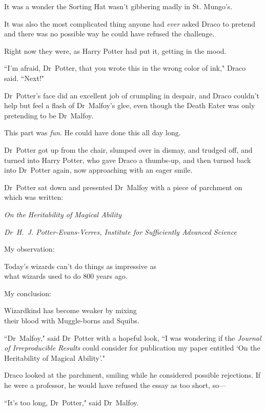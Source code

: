 It was a wonder the Sorting Hat wasn't gibbering madly in St. Mungo's.

It was also the most complicated thing anyone had \emph{ever} asked Draco to pretend and there was no possible way he could have refused the challenge.

Right now they were, as Harry Potter had put it, getting in the mood.

``I'm afraid, Dr~Potter, that you wrote this in the wrong color of ink," Draco said. ``Next!"

Dr~Potter's face did an excellent job of crumpling in despair, and Draco couldn't help but feel a flash of Dr~Malfoy's glee, even though the Death Eater was only pretending to be Dr~Malfoy.

This part was \emph{fun}. He could have done this all day long.

Dr~Potter got up from the chair, slumped over in dismay, and trudged off, and turned into Harry Potter, who gave Draco a thumbs-up, and then turned back into Dr~Potter again, now approaching with an eager smile.

Dr~Potter sat down and presented Dr~Malfoy with a piece of parchment on which was written:

\begin{center}
\emph{On the Heritability of Magical Ability}

\emph{Dr~H.~J. Potter-Evans-Verres, Institute for Sufficiently Advanced Science}
\end{center}

\begin{writtenNote}
My observation:

Today's wizards can't do things as impressive as\\
what wizards used to do 800 years ago.

My conclusion:

Wizardkind has become weaker by mixing\\
their blood with Muggle-borns and Squibs.
\end{writtenNote}

``Dr~Malfoy," said Dr~Potter with a hopeful look, ``I was wondering if the \emph{Journal of Irreproducible Results} could consider for publication my paper entitled `On the Heritability of Magical Ability'."

Draco looked at the parchment, smiling while he considered possible rejections. If he were a professor, he would have refused the essay as too short, so—

``It's too long, Dr~Potter," said Dr~Malfoy.

